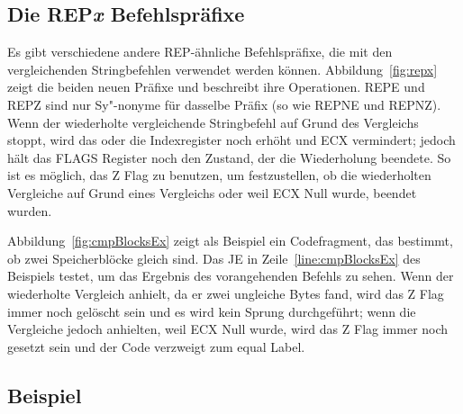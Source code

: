 \subsection{Die {\code REP\emph{x}} Befehlspr\"{a}fixe}

Es gibt verschiedene andere {\code REP}-\"{a}hnliche Befehlspr\"{a}fixe, die
mit den vergleichenden Stringbefehlen verwendet werden k\"{o}nnen.
Abbildung~\ref{fig:repx} zeigt die beiden neuen Pr\"{a}fixe und
beschreibt ihre Operationen. {\code REPE}
 und {\code REPZ} sind nur
Sy"-nonyme f\"{u}r dasselbe Pr\"{a}fix (so wie {\code REPNE}
 und {\code REPNZ}). Wenn der
wiederholte vergleichende Stringbefehl auf Grund des Vergleichs
stoppt, wird das oder die Indexregister noch erh\"{o}ht und ECX
vermindert; jedoch h\"{a}lt das FLAGS Register noch den Zustand, der die
Wiederholung beendete.  So ist
es m\"{o}glich, das Z Flag zu benutzen, um festzustellen, ob die
wiederholten Vergleiche auf Grund eines Vergleichs oder weil ECX
Null wurde, beendet wurden.

Abbildung~\ref{fig:cmpBlocksEx} zeigt als Beispiel ein Codefragment,
das bestimmt, ob zwei Speicherbl\"{o}cke gleich sind. Das {\code JE} in
Zeile~\ref{line:cmpBlocksEx} des Beispiels testet, um das Ergebnis
des vorangehenden Befehls zu sehen. Wenn der wiederholte Vergleich
anhielt, da er zwei ungleiche Bytes fand, wird das Z Flag immer noch
gel\"{o}scht sein und es wird kein Sprung durchgef\"{u}hrt; wenn die
Vergleiche jedoch anhielten, weil ECX Null wurde, wird das Z Flag
immer noch gesetzt sein und der Code verzweigt zum {\code equal}
Label.

\subsection{Beispiel}

